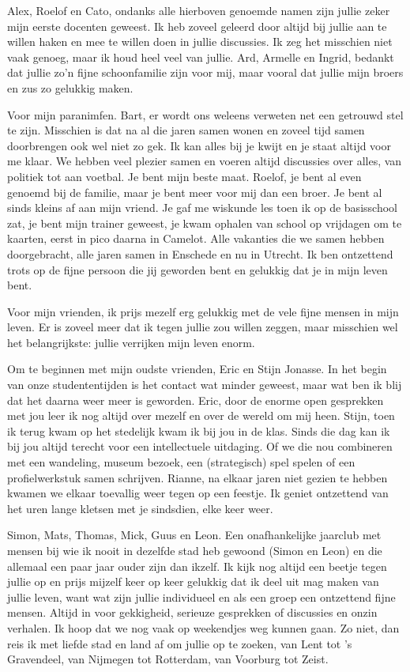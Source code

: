 \documentclass[openright,titlepage,12pt,a4paper]{book}
\begin{document}
Alex, Roelof en Cato, ondanks alle hierboven genoemde namen zijn jullie zeker mijn eerste docenten geweest. Ik heb zoveel geleerd door altijd bij jullie aan te willen haken en mee te willen doen in jullie discussies. Ik zeg het misschien niet vaak genoeg, maar ik houd heel veel van jullie. Ard, Armelle en Ingrid, bedankt dat jullie zo'n fijne schoonfamilie zijn voor mij, maar vooral dat jullie mijn broers en zus zo gelukkig maken.

Voor mijn paranimfen. Bart, er wordt ons weleens verweten net een getrouwd stel te zijn. Misschien is dat na al die jaren samen wonen en zoveel tijd samen doorbrengen ook wel niet zo gek. Ik kan alles bij je kwijt en je staat altijd voor me klaar. We hebben veel plezier samen en voeren altijd discussies over alles, van politiek tot aan voetbal. Je bent mijn beste maat. Roelof, je bent al even genoemd bij de familie, maar je bent meer voor mij dan een broer. Je bent al sinds kleins af aan mijn vriend. Je gaf me wiskunde les toen ik op de basisschool zat, je bent mijn trainer geweest, je kwam ophalen van school op vrijdagen om te kaarten, eerst in pico daarna in Camelot. Alle vakanties die we samen hebben doorgebracht, alle jaren samen in Enschede en nu in Utrecht. Ik ben ontzettend trots op de fijne persoon die jij geworden bent en gelukkig dat je in mijn leven bent.

Voor mijn vrienden, ik prijs mezelf erg gelukkig met de vele fijne mensen in mijn leven. Er is zoveel meer dat ik tegen jullie zou willen zeggen, maar misschien wel het belangrijkste: jullie verrijken mijn leven enorm.

Om te beginnen met mijn oudste vrienden, Eric en Stijn Jonasse. In het begin van onze studententijden is het contact wat minder geweest, maar wat ben ik blij dat het daarna weer meer is geworden. Eric, door de enorme open gesprekken met jou leer ik nog altijd over mezelf en over de wereld om mij heen. Stijn, toen ik terug kwam op het stedelijk kwam ik bij jou in de klas. Sinds die dag kan ik bij jou altijd terecht voor een intellectuele uitdaging. Of we die nou combineren met een wandeling, museum bezoek, een (strategisch) spel spelen of een profielwerkstuk samen schrijven. Rianne, na elkaar jaren niet gezien te hebben kwamen we elkaar toevallig weer tegen op een feestje. Ik geniet ontzettend van het uren lange kletsen met je sindsdien, elke keer weer.

Simon, Mats, Thomas, Mick, Guus en Leon. Een onafhankelijke jaarclub met mensen bij wie ik nooit in dezelfde stad heb gewoond (Simon en Leon) en die allemaal een paar jaar ouder zijn dan ikzelf. Ik kijk nog altijd een beetje tegen jullie op en prijs mijzelf keer op keer gelukkig dat ik deel uit mag maken van jullie leven, want wat zijn jullie individueel en als een groep een ontzettend fijne mensen. Altijd in voor gekkigheid, serieuze gesprekken of discussies en onzin verhalen. Ik hoop dat we nog vaak op weekendjes weg kunnen gaan. Zo niet, dan reis ik met liefde stad en land af om jullie op te zoeken, van Lent tot 's Gravendeel, van Nijmegen tot Rotterdam, van Voorburg tot Zeist.
\end{document}
